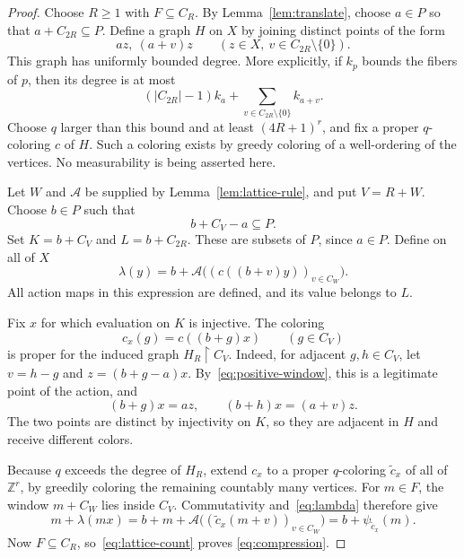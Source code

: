 \documentclass[10pt,a4paper]{amsart}
\newcommand{\ZZ}{\mathbb Z}
\begin{document}
\begin{proof}
Choose $R\ge1$ with $F\subseteq C_R$. By Lemma~\ref{lem:translate}, choose
$a\in P$ so that $a+C_{2R}\subseteq P$. Define a graph $H$ on $X$ by
joining distinct points of the form
\begin{equation}\label{eq:auxiliary-edges}
 az,\ (a+v)z
 \qquad(z\in X,\ v\in C_{2R}\setminus\{0\}).
\end{equation}
This graph has uniformly bounded degree. More explicitly, if $k_p$ bounds
the fibers of $p$, then its degree is at most
\[
 (|C_{2R}|-1)k_a+
 \sum_{v\in C_{2R}\setminus\{0\}}k_{a+v}.
\]
Choose $q$ larger than this bound and at least $(4R+1)^r$, and fix a proper
$q$-coloring $c$ of $H$. Such a coloring exists by greedy coloring of a
well-ordering of the vertices. No measurability is being asserted here.

Let $W$ and $\mathcal A$ be supplied by Lemma~\ref{lem:lattice-rule}, and
put $V=R+W$. Choose $b\in P$ such that
\begin{equation}\label{eq:positive-window}
 b+C_V-a\subseteq P.
\end{equation}
Set $K=b+C_V$ and $L=b+C_{2R}$. These are subsets of $P$, since $a\in P$.
Define on all of $X$
\begin{equation}\label{eq:lambda}
 \lambda(y)=b+
 \mathcal A\bigl((c((b+v)y))_{v\in C_W}\bigr).
\end{equation}
All action maps in this expression are defined, and its value belongs to
$L$.

Fix $x$ for which evaluation on $K$ is injective. The coloring
\[
 c_x(g)=c((b+g)x)\qquad(g\in C_V)
\]
is proper for the induced graph $H_R\upharpoonright C_V$. Indeed, for
adjacent $g,h\in C_V$, let $v=h-g$ and
$z=(b+g-a)x$. By~\eqref{eq:positive-window}, this is a legitimate point of
the action, and
\[
 (b+g)x=az,\qquad (b+h)x=(a+v)z.
\]
The two points are distinct by injectivity on $K$, so they are adjacent in
$H$ and receive different colors.

Because $q$ exceeds the degree of $H_R$, extend $c_x$ to a proper
$q$-coloring $\widetilde c_x$ of all of $\ZZ^r$, by greedily coloring the
remaining countably many vertices. For $m\in F$, the window $m+C_W$ lies
inside $C_V$. Commutativity and~\eqref{eq:lambda} therefore give
\[
 m+\lambda(mx)
 =b+m+\mathcal A\bigl((\widetilde c_x(m+v))_{v\in C_W}\bigr)
 =b+\psi_{\widetilde c_x}(m).
\]
Now $F\subseteq C_R$, so~\eqref{eq:lattice-count} proves
\eqref{eq:compression}.
\end{proof}
\end{document}
